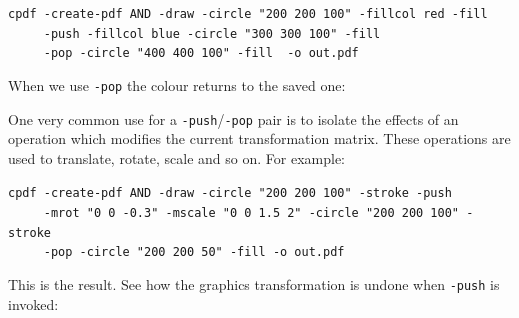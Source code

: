 \documentclass{book}
\begin{document}
\begin{framed}
 \noindent\small\verb?cpdf -create-pdf AND -draw -circle "200 200 100" -fillcol red -fill?\\
 \noindent\small\verb?     -push -fillcol blue -circle "300 300 100" -fill?\\
 \noindent\small\verb?     -pop -circle "400 400 100" -fill  -o out.pdf?
\end{framed}

\noindent When we use \texttt{-pop} the colour returns to the saved one:

\bigskip
{}
\bigskip

\noindent One very common use for a \texttt{-push}/\texttt{-pop} pair is to isolate the effects of an operation which modifies the current transformation matrix. These operations are used to translate, rotate, scale and so on. For example: 

\begin{framed}
 \noindent\small\verb?cpdf -create-pdf AND -draw -circle "200 200 100" -stroke -push?\\
 \noindent\small\verb?     -mrot "0 0 -0.3" -mscale "0 0 1.5 2" -circle "200 200 100" -stroke?\\
 \noindent\small\verb?     -pop -circle "200 200 50" -fill -o out.pdf?
\end{framed}

\noindent This is the result. See how the graphics transformation is undone when \texttt{-push} is invoked:

\bigskip
{}
\bigskip
\end{document}

